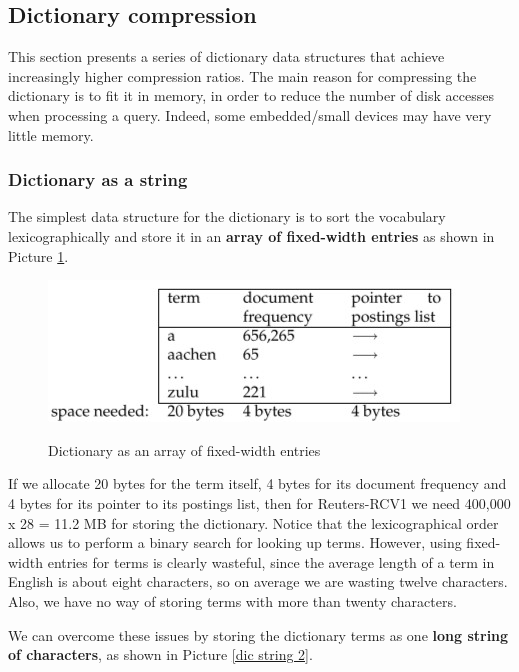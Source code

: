 \subsection{Dictionary compression}
This section presents a series of dictionary data structures that achieve increasingly higher compression ratios. The main reason for compressing the dictionary is to fit it in memory, in order to reduce the number of disk accesses when processing a query. Indeed, some embedded/small devices may have very little memory. 

\subsubsection{Dictionary as a string}
The simplest data structure for the dictionary is to sort the vocabulary lexicographically and store it in an \textbf{array of fixed-width entries} as shown in Picture \ref{dic string}.

\begin{figure}[h!]
		\centering
		\includegraphics[scale = 1.7]{img/dictionary string.jpg}
		\label{dic string}
        \caption{Dictionary as an array of fixed-width entries}
\end{figure}

If we allocate 20 bytes for the term itself, 4 bytes for its document frequency and 4 bytes for its pointer to its postings list, then for Reuters-RCV1 we need 400,000 x 28 = 11.2 MB for storing the dictionary. Notice that the lexicographical order allows us to perform a binary search for looking up terms. However, using fixed-width entries for terms is clearly wasteful, since the average length of a term in English is about eight characters, so on average we are wasting twelve characters. Also, we have no way of storing terms with more than twenty characters. 

We can overcome these issues by storing the dictionary terms as one \textbf{long string of characters}, as shown in Picture \ref{dic string 2}.

